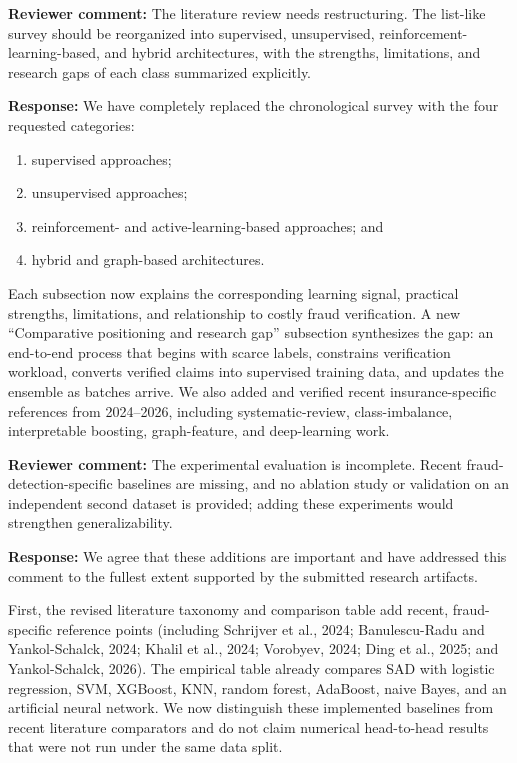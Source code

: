 \documentclass[11pt]{article}
\newcommand{\reviewercomment}[1]{%
  \vspace{4pt}\noindent\colorbox{revisionyellow}{%
  \parbox{\dimexpr\linewidth-2\fboxsep}{\textbf{Reviewer comment:} #1}}}
\newcommand{\response}{\noindent\textbf{Response:} }
\begin{document}
\reviewercomment{The literature review needs restructuring. The list-like
survey should be reorganized into supervised, unsupervised,
reinforcement-learning-based, and hybrid architectures, with the strengths,
limitations, and research gaps of each class summarized explicitly.}

\response We have completely replaced the chronological survey with the four
requested categories:
\begin{enumerate}[label=(\roman*),leftmargin=*]
  \item supervised approaches;
  \item unsupervised approaches;
  \item reinforcement- and active-learning-based approaches; and
  \item hybrid and graph-based architectures.
\end{enumerate}
Each subsection now explains the corresponding learning signal, practical
strengths, limitations, and relationship to costly fraud verification. A new
``Comparative positioning and research gap'' subsection synthesizes the gap:
an end-to-end process that begins with scarce labels, constrains verification
workload, converts verified claims into supervised training data, and updates
the ensemble as batches arrive. We also added and verified recent
insurance-specific references from 2024--2026, including systematic-review,
class-imbalance, interpretable boosting, graph-feature, and deep-learning work.

\reviewercomment{The experimental evaluation is incomplete. Recent
fraud-detection-specific baselines are missing, and no ablation study or
validation on an independent second dataset is provided; adding these
experiments would strengthen generalizability.}

\response We agree that these additions are important and have addressed this
comment to the fullest extent supported by the submitted research artifacts.

First, the revised literature taxonomy and comparison table add recent,
fraud-specific reference points (including Schrijver et al., 2024;
Banulescu-Radu and Yankol-Schalck, 2024; Khalil et al., 2024; Vorobyev, 2024;
Ding et al., 2025; and Yankol-Schalck, 2026). The empirical table already
compares SAD with logistic regression, SVM, XGBoost, KNN, random forest,
AdaBoost, naive Bayes, and an artificial neural network. We now distinguish
these implemented baselines from recent literature comparators and do not
claim numerical head-to-head results that were not run under the same data
split.
\end{document}
